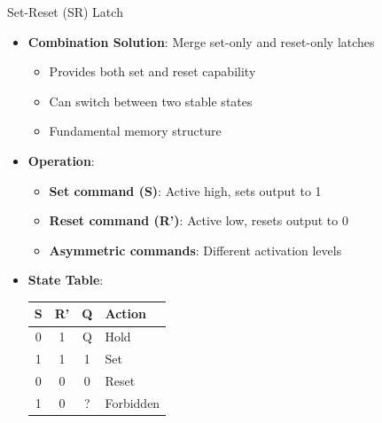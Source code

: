 \documentclass[aspectratio=169,11pt]{beamer}
\newcommand{\concept}[1]{\textbf{\color{accentcolor}#1}}
\begin{document}
\begin{frame}{Set-Reset (SR) Latch}
\begin{itemize}
\item \concept{Combination Solution}: Merge set-only and reset-only latches
\begin{itemize}
\item Provides both set and reset capability
\item Can switch between two stable states
\item Fundamental memory structure
\end{itemize}
\vspace{0.5cm}
\item \concept{Operation}:
\begin{itemize}
\item \textbf{Set command (S)}: Active high, sets output to 1
\item \textbf{Reset command (R')}: Active low, resets output to 0
\item \textbf{Asymmetric commands}: Different activation levels
\end{itemize}
\vspace{0.3cm}
\item \concept{State Table}:
\begin{center}
\begin{tabular}{|c|c|c|l|}
\hline
S & R' & Q & Action \\
\hline
0 & 1 & Q & Hold \\
1 & 1 & 1 & Set \\
0 & 0 & 0 & Reset \\
1 & 0 & ? & Forbidden \\
\hline
\end{tabular}
\end{center}
\end{itemize}
\end{frame}
\end{document}
